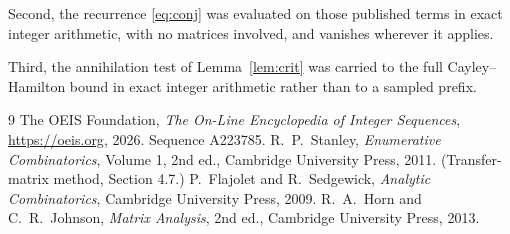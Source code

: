 \documentclass[11pt,a4paper]{article}
\theoremstyle{plain}
\theoremstyle{definition}
\begin{document}
Second, the recurrence \eqref{eq:conj} was evaluated on those published terms in exact
integer arithmetic, with no matrices involved, and vanishes wherever it applies.

Third, the annihilation test of Lemma~\ref{lem:crit} was carried to the full
Cayley--Hamilton bound in exact integer arithmetic rather than to a sampled prefix.

\begin{thebibliography}{9}
 The OEIS Foundation, \emph{The On-Line Encyclopedia of Integer
Sequences}, \url{https://oeis.org}, 2026. Sequence A223785.
 R.~P.~Stanley, \emph{Enumerative Combinatorics}, Volume 1, 2nd ed.,
Cambridge University Press, 2011. (Transfer-matrix method, Section 4.7.)
 P.~Flajolet and R.~Sedgewick, \emph{Analytic Combinatorics}, Cambridge
University Press, 2009.
 R.~A.~Horn and C.~R.~Johnson, \emph{Matrix Analysis}, 2nd ed., Cambridge
University Press, 2013.
\end{thebibliography}
\end{document}

